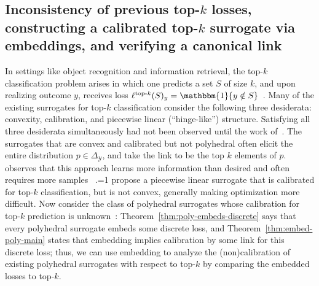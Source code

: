 \documentclass[11pt]{article}
\newcommand{\Comments}{1}
\newcommand{\mytodo}[2]{\ifnum\Comments=1%
  \todo[linecolor=#1!80!black,backgroundcolor=#1,bordercolor=#1!80!black]{#2}\fi}
\newcommand{\jessiet}[1]{\mytodo{teal!20!white}{JF: #1}}
\newcommand{\simplex}{\Delta_\Y}
\newcommand{\Y}{\mathcal{Y}}
\newcommand{\ones}{\mathbbm{1}}
\newcommand{\elltopk}{\ell^{\text{top-$k$}}}
\begin{document}
\subsection{Inconsistency of previous top-$k$ losses, constructing a calibrated top-$k$ surrogate via embeddings, and verifying a canonical link}
\label{sec:top-k}
In settings like object recognition and information retrieval, the top-$k$ classification problem arises in which one predicts a set $S$ of size $k$, and upon realizing outcome $y$, receives loss $\elltopk(S)_y = \ones\{y\notin S\}$~\citep{lapin2015top, lapin2016loss, lapin2018analysis,yang2018consistency,berrada2018smooth,rastegari2011scalable,reddi2019stochastic}.
Many of the existing surrogates for top-$k$ classification consider the following three desiderata: convexity, calibration, and piecewise linear (``hinge-like'') structure.
Satisfying all three desiderata simultaneously had not been observed until the work of~\citet{finocchiaro2022consistenttopk}.
The surrogates that are convex and calibrated but not polyhedral often elicit the entire distribution $p \in \simplex$, and take the link to be the top $k$ elements of $p$.
\citet{lapin2016loss} observes that this approach learns more information than desired and often requires more samples
~\citep{frongillo2021surrogate}.\jessiet{right?}
\citet{yang2018consistency} propose a piecewise linear surrogate that is calibrated for top-$k$ classification, but is not convex, generally making optimization more difficult.
Now consider the class of polyhedral surrogates whose calibration for top-$k$ prediction is unknown~\citep{yang2018consistency,lapin2016loss,lapin2018analysis}: Theorem~\ref{thm:poly-embeds-discrete} says that every polyhedral surrogate embeds some discrete loss, and Theorem~\ref{thm:embed-poly-main} states that embedding implies calibration by some link for this discrete loss; thus, we can use embedding to analyze the (non)calibration of existing polyhedral surrogates with respect to top-$k$ by comparing the embedded losses to top-$k$.

\end{document}
